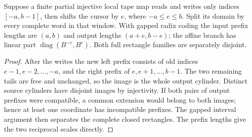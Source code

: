 \begin{lemma}
\label{lem:bb-window-rectangles}
Suppose a finite partial injective local tape map reads and writes only
indices $[-a,b-1]$, then shifts the cursor by $e$, where
$-a\le e\le b$.  Split its domain by every complete word in that
window.  With gapped radix coding the input prefix lengths are
$(a,b)$ and output lengths $(a+e,b-e)$; the affine branch has linear
part $\operatorname{diag}(B^{-e},B^e)$.  Both full rectangle families
are separately disjoint.
\end{lemma}
\begin{proof}
After the writes the new left prefix consists of old indices
$e-1,e-2,\ldots,-a$, and the right prefix of $e,e+1,\ldots,b-1$.
The two remaining tails are free and unchanged, so the image is the
whole output cylinder.  Distinct source cylinders have disjoint
images by injectivity.  If both pairs of output prefixes were
compatible, a common extension would belong to both images; hence
at least one coordinate has incompatible prefixes.  The gapped
interval argument then separates the complete closed rectangles.
The prefix lengths give the two reciprocal scales directly.
\end{proof}
